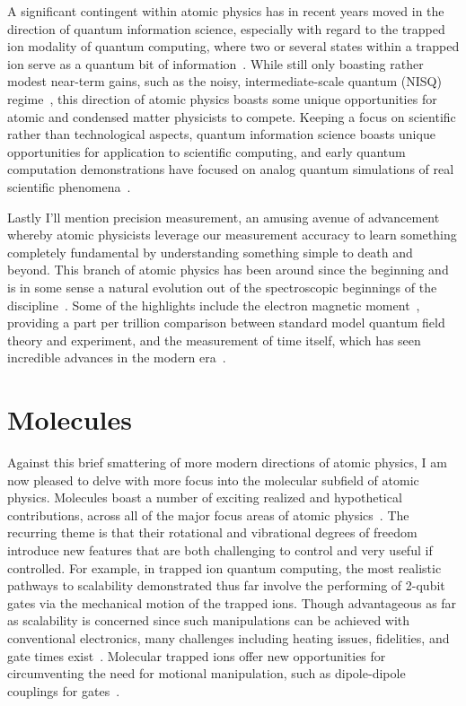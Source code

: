 A significant contingent within atomic physics has in recent years moved in the direction of quantum information science, especially with regard to the trapped ion modality of quantum computing, where two or several states within a trapped ion serve as a quantum bit of information~\cite{Zoller1995,Haffner2008}.
While still only boasting rather modest near-term gains, such as the noisy, intermediate-scale quantum (NISQ) regime~\cite{Preskill2018}, this direction of atomic physics boasts some unique opportunities for atomic and condensed matter physicists to compete.
Keeping a focus on scientific rather than technological aspects, quantum information science boasts unique opportunities for application to scientific computing, and early quantum computation demonstrations have focused on analog quantum simulations of real scientific phenomena~\cite{Kassal2008,Lu2011}.

Lastly I'll mention precision measurement, an amusing avenue of advancement whereby atomic physicists leverage our measurement accuracy to learn something completely fundamental by understanding something simple to death and beyond.
This branch of atomic physics has been around since the beginning and is in some sense a natural evolution out of the spectroscopic beginnings of the discipline~\cite{Drake2018}.
Some of the highlights include the electron magnetic moment~\cite{Hanneke2008}, providing a part per trillion comparison between standard model quantum field theory and experiment, and the measurement of time itself, which has seen incredible advances in the modern era~\cite{Bloom2014}.

\section{Molecules}

Against this brief smattering of more modern directions of atomic physics, I am now pleased to delve with more focus into the molecular subfield of atomic physics.
Molecules boast a number of exciting realized and hypothetical contributions, across all of the major focus areas of atomic physics~\cite{Carr2009}.
The recurring theme is that their rotational and vibrational degrees of freedom introduce new features that are both challenging to control and very useful if controlled.
For example, in trapped ion quantum computing, the most realistic pathways to scalability demonstrated thus far involve the performing of 2-qubit gates via the mechanical motion of the trapped ions.
Though advantageous as far as scalability is concerned since such manipulations can be achieved with conventional electronics, many challenges including heating issues, fidelities, and gate times exist~\cite{Bruzewicz2019}.
Molecular trapped ions offer new opportunities for circumventing the need for motional manipulation, such as dipole-dipole couplings for gates~\cite{Schuster2011}.

